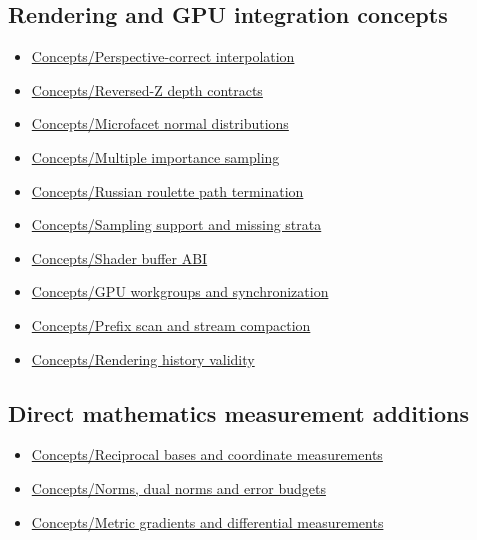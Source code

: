 \subsection{Rendering and GPU integration concepts}\label{appendix-a6d556a4ef50-rendering-and-gpu-integration-concepts}

\begin{itemize}
\tightlist
\item
  \hyperref[appendix-1ed5f96c73ea]{Concepts/Perspective-correct interpolation}
\item
  \hyperref[appendix-275ec8847057]{Concepts/Reversed-Z depth contracts}
\item
  \hyperref[appendix-885c1cb64ae9]{Concepts/Microfacet normal distributions}
\item
  \hyperref[appendix-ca8898faf1a6]{Concepts/Multiple importance sampling}
\item
  \hyperref[appendix-7277c62d4599]{Concepts/Russian roulette path termination}
\item
  \hyperref[appendix-10308c3d753e]{Concepts/Sampling support and missing strata}
\item
  \hyperref[appendix-749048795dbb]{Concepts/Shader buffer ABI}
\item
  \hyperref[appendix-f662b5b1773b]{Concepts/GPU workgroups and synchronization}
\item
  \hyperref[appendix-f2ee4d086415]{Concepts/Prefix scan and stream compaction}
\item
  \hyperref[appendix-2e7e9fd28a2c]{Concepts/Rendering history validity}
\end{itemize}

\subsection{Direct mathematics measurement additions}\label{appendix-a6d556a4ef50-direct-mathematics-measurement-additions}

\begin{itemize}
\tightlist
\item
  \hyperref[appendix-6b3d696dd902]{Concepts/Reciprocal bases and coordinate measurements}
\item
  \hyperref[appendix-d6d9dbbe3c14]{Concepts/Norms, dual norms and error budgets}
\item
  \hyperref[appendix-f4acdb1d5563]{Concepts/Metric gradients and differential measurements}
\end{itemize}
